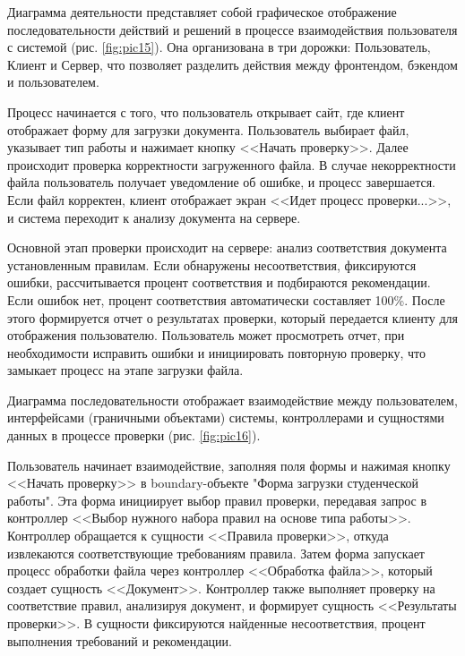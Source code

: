 \documentclass{report}
\begin{document}
Диаграмма деятельности представляет собой графическое отображение последовательности действий и решений в процессе взаимодействия пользователя с системой (рис.  \ref{fig:pic15}). Она организована в три дорожки: Пользователь, Клиент и Сервер, что позволяет разделить действия между фронтендом, бэкендом и пользователем. 

Процесс начинается с того, что пользователь открывает сайт, где клиент отображает форму для загрузки документа. Пользователь выбирает файл, указывает тип работы и нажимает кнопку <<Начать проверку>>. Далее происходит проверка корректности загруженного файла. В случае некорректности файла пользователь получает уведомление об ошибке, и процесс завершается. Если файл корректен, клиент отображает экран <<Идет процесс проверки...>>, и система переходит к анализу документа на сервере.


   Основной этап проверки происходит на сервере: анализ соответствия документа установленным правилам. Если обнаружены несоответствия, фиксируются ошибки, рассчитывается процент соответствия и подбираются рекомендации. Если ошибок нет, процент соответствия автоматически составляет 100\%. После этого формируется отчет о результатах проверки, который передается клиенту для отображения пользователю. Пользователь может просмотреть отчет, при необходимости исправить ошибки и инициировать повторную проверку, что замыкает процесс на этапе загрузки файла.

Диаграмма последовательности отображает взаимодействие между пользователем, интерфейсами (граничными объектами) системы, контроллерами и сущностями данных в процессе проверки (рис.  \ref{fig:pic16}). 


Пользователь начинает взаимодействие, заполняя поля формы и нажимая кнопку <<Начать проверку>> в boundary-объекте "Форма загрузки студенческой работы". Эта форма инициирует выбор правил проверки, передавая запрос в контроллер <<Выбор нужного набора правил на основе типа работы>>. Контроллер обращается к сущности <<Правила проверки>>, откуда извлекаются соответствующие требованиям правила. Затем форма запускает процесс обработки файла через контроллер <<Обработка файла>>, который создает сущность <<Документ>>. Контроллер также выполняет проверку на соответствие правил, анализируя документ, и формирует сущность <<Результаты проверки>>. В сущности фиксируются найденные несоответствия, процент выполнения требований и рекомендации.
\end{document}
